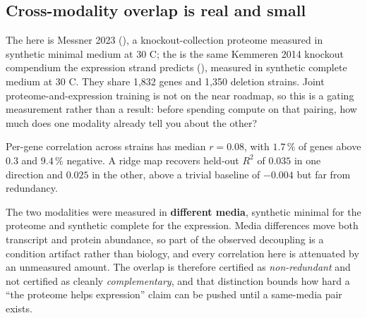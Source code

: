 \subsection{Cross-modality overlap is real and small}

 The  here is
Messner 2023 (), a knockout-collection proteome
measured in synthetic minimal medium at 30 C; the  is the same Kemmeren
2014 knockout compendium the expression strand predicts
(), measured in synthetic complete medium at 30 C. They share 1,832 genes and 1,350 deletion strains.
Joint proteome-and-expression training is not on the near roadmap, so this is a gating
measurement rather than a result: before spending compute on that pairing, how much does one
modality already tell you about the other?

Per-gene correlation across strains has median $r = 0.08$, with $1.7\,\%$ of genes above
$0.3$ and $9.4\,\%$ negative. A ridge map recovers held-out $R^2$ of $0.035$ in one
direction and $0.025$ in the other, above a trivial baseline of $-0.004$ but far from
redundancy.


 The two modalities were measured
in \textbf{different media}, synthetic minimal for the proteome and synthetic complete for
the expression. Media differences move both transcript and protein abundance, so part of the
observed decoupling is a condition artifact rather than biology, and every correlation here
is attenuated by an unmeasured amount. The overlap is therefore certified as
\emph{non-redundant} and not certified as cleanly \emph{complementary}, and that distinction
bounds how hard a ``the proteome helps expression'' claim can be pushed until a same-media
pair exists.

